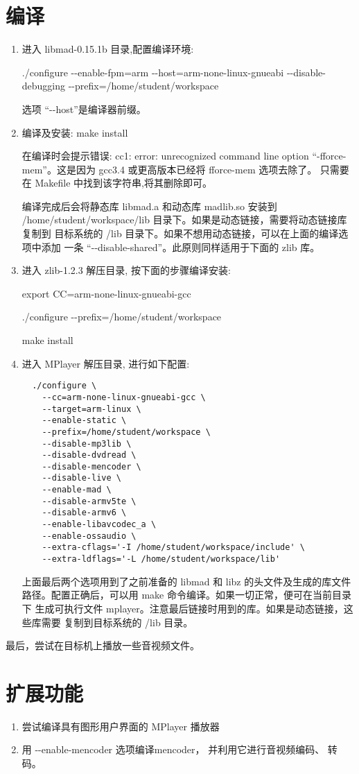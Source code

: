 \section{编译}
\begin{enumerate}
  \item 进入 libmad-0.15.1b 目录,配置编译环境:

	./configure -{}-enable-fpm=arm -{}-host=arm-none-linux-gnueabi
	-{}-disable-debugging -{}-prefix=/home/student/workspace

	选项 ``-{}-host''是编译器前缀。

  \item 编译及安装:  make install

	在编译时会提示错误: cc1: error: unrecognized command line option
	``-fforce-mem''。这是因为 gcc3.4 或更高版本已经将 fforce-mem 选项去除了。
	只需要在 Makefile 中找到该字符串,将其删除即可。

	编译完成后会将静态库 libmad.a 和动态库 madlib.so 安装到
	/home/student/workspace/lib 目录下。如果是动态链接，需要将动态链接库复制到
	目标系统的 /lib 目录下。如果不想用动态链接，可以在上面的编译选项中添加
	一条 ``-{}-disable-shared''。此原则同样适用于下面的 zlib 库。

  \item 进入 zlib-1.2.3 解压目录, 按下面的步骤编译安装:

	export CC=arm-none-linux-gnueabi-gcc

	./configure -{}-prefix=/home/student/workspace

	make install

  \item 进入 MPlayer 解压目录, 进行如下配置:
\begin{verbatim}
  ./configure \
    --cc=arm-none-linux-gnueabi-gcc \
    --target=arm-linux \
    --enable-static \
    --prefix=/home/student/workspace \
    --disable-mp3lib \
    --disable-dvdread \
    --disable-mencoder \
    --disable-live \
    --enable-mad \
    --disable-armv5te \
    --disable-armv6 \
    --enable-libavcodec_a \
    --enable-ossaudio \
    --extra-cflags='-I /home/student/workspace/include' \
    --extra-ldflags='-L /home/student/workspace/lib'
    \end{verbatim}
	上面最后两个选项用到了之前准备的 libmad 和 libz 的头文件及生成的库文件
	路径。配置正确后，可以用 make 命令编译。如果一切正常，便可在当前目录下
	生成可执行文件 mplayer。注意最后链接时用到的库。如果是动态链接，这些库需要
	复制到目标系统的 /lib 目录。
\end{enumerate}

	最后，尝试在目标机上播放一些音视频文件。

\section{扩展功能}
\begin{enumerate}
  \item 尝试编译具有图形用户界面的 MPlayer 播放器
  \item 用 -{}-enable-mencoder 选项编译mencoder， 并利用它进行音视频编码、
	转码。
\end{enumerate}
